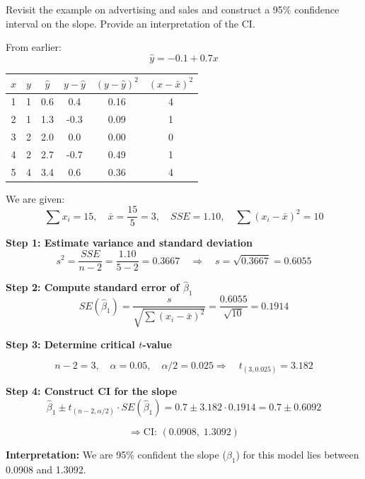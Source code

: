 \begin{example}[continued]
Revisit the example on advertising and sales and construct a 95\% confidence interval on the slope. Provide an interpretation of the CI.

From earlier:
\[
\hat{y} = -0.1 + 0.7x
\]

\begin{center}
\begin{tabular}{cccccc}
\toprule
\textbf{$x$} & \textbf{$y$} & \textbf{$\hat{y}$} & \textbf{$y - \hat{y}$} & \textbf{$(y - \hat{y})^2$} & \textbf{$(x - \bar{x})^2$} \\
\midrule
1 & 1 & 0.6 & 0.4 & 0.16 & 4 \\
2 & 1 & 1.3 & -0.3 & 0.09 & 1 \\
3 & 2 & 2.0 & 0.0 & 0.00 & 0 \\
4 & 2 & 2.7 & -0.7 & 0.49 & 1 \\
5 & 4 & 3.4 & 0.6 & 0.36 & 4 \\
\bottomrule
\end{tabular}
\end{center}

\vspace{1em}
We are given:
\[
\sum x_i = 15, \quad \bar{x} = \frac{15}{5} = 3, \quad SSE = 1.10, \quad \sum (x_i - \bar{x})^2 = 10
\]

\vspace{1em}
\textbf{Step 1: Estimate variance and standard deviation}
\[
s^2 = \frac{SSE}{n-2} = \frac{1.10}{5 - 2} = 0.3667
\quad \Rightarrow \quad
s = \sqrt{0.3667} = 0.6055
\]

\vspace{1em}
\textbf{Step 2: Compute standard error of $\hat{\beta}_1$}
\[
SE(\hat{\beta}_1) = \frac{s}{\sqrt{\sum (x_i - \bar{x})^2}} 
= \frac{0.6055}{\sqrt{10}} = 0.1914
\]

\vspace{1em}
\textbf{Step 3: Determine critical $t$-value}

\[
n - 2 = 3, \quad \alpha = 0.05, \quad \alpha/2 = 0.025
\Rightarrow \quad
t_{(3, 0.025)} = 3.182
\]

\vspace{1em}
\textbf{Step 4: Construct CI for the slope}
\[
\hat{\beta}_1 \pm t_{(n-2, \alpha/2)} \cdot SE(\hat{\beta}_1)
= 0.7 \pm 3.182 \cdot 0.1914 = 0.7 \pm 0.6092
\]

\[
\Rightarrow \text{CI: } (0.0908, \; 1.3092)
\]

\vspace{1em}
\textbf{Interpretation:}  
We are 95\% confident the slope ($\beta_1$) for this model lies between 0.0908 and 1.3092.
\end{example}
